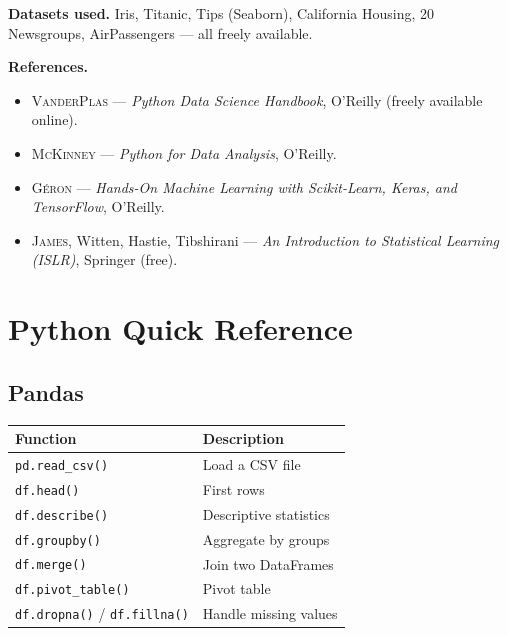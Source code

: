 \documentclass[12pt,a4paper,twoside]{book}
\theoremstyle{definition}
\theoremstyle{plain}
\theoremstyle{remark}
\newcommand{\py}[1]{\texttt{#1}}
\begin{document}
\medskip
\textbf{Datasets used.} Iris, Titanic, Tips (Seaborn), California Housing, 20 Newsgroups, AirPassengers --- all freely available.

\medskip
\textbf{References.}
\begin{itemize}
\item \textsc{VanderPlas} --- \emph{Python Data Science Handbook}, O'Reilly (freely available online).
\item \textsc{McKinney} --- \emph{Python for Data Analysis}, O'Reilly.
\item \textsc{G\'eron} --- \emph{Hands-On Machine Learning with Scikit-Learn, Keras, and TensorFlow}, O'Reilly.
\item \textsc{James}, Witten, Hastie, Tibshirani --- \emph{An Introduction to Statistical Learning (ISLR)}, Springer (free).
\end{itemize}

\mainmatter













\backmatter
\appendix
\chapter{Python Quick Reference}
\label{app:python}

\section{Pandas}
\begin{tabular}{ll}
\toprule
\textbf{Function} & \textbf{Description} \\
\midrule
\py{pd.read_csv()} & Load a CSV file \\
\py{df.head()} & First rows \\
\py{df.describe()} & Descriptive statistics \\
\py{df.groupby()} & Aggregate by groups \\
\py{df.merge()} & Join two DataFrames \\
\py{df.pivot_table()} & Pivot table \\
\py{df.dropna()} / \py{df.fillna()} & Handle missing values \\
\bottomrule
\end{tabular}
\end{document}

